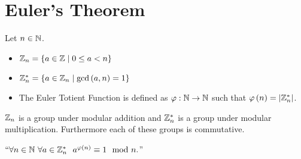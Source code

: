     \section{Euler's Theorem}
        \begin{definition}
            Let $n \in \mathbb{N}$.
            \begin{itemize}
                \item
                    $\mathbb{Z}_{n} = \left\{a \in \mathbb{Z} \mid 0 \le a < n\right\}$
                \item
                    $\mathbb{Z}_{n}^{*} = \left\{a \in \mathbb{Z}_{n} \mid \mathrm{gcd}\left(a, n\right) = 1\right\}$
                \item
                    The Euler Totient Function is defined as $\varphi: \mathbb{N} \rightarrow \mathbb{N}$ 
                    such that $\varphi\left(n\right) = |\mathbb{Z}_{n}^{*}|$.
            \end{itemize}
        \end{definition}
        \begin{fact}
            $\mathbb{Z}_{n}$ is a group under modular addition and $\mathbb{Z}_{n}^{*}$ is a group under modular
            multiplication. Furthermore each of these groups is commutative.
        \end{fact}
        \begin{theorem}
            \label{Euler's Theorem}
            $``\forall n \in \mathbb{N} \ \forall a \in \mathbb{Z}_{n}^{*} \ \ a^{\varphi\left(n\right)} \equiv 1 \mod n.$''
        \end{theorem}
